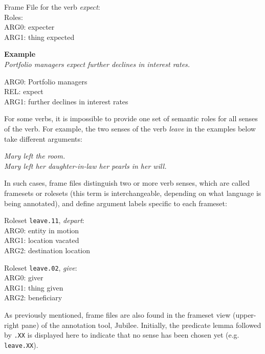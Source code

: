 \documentclass[11pt]{report}
\begin{document}
Frame File for the verb \textit{expect}:\\
Roles: \\
ARG0: expecter\\
ARG1: thing expected

\textbf{Example}\\
\textit{Portfolio managers expect further declines in interest rates.}

ARG0: Portfolio managers\\
REL: expect\\
ARG1: further declines in interest rates

\noindent For some verbs, it is impossible to provide one set of semantic roles for all senses of the verb. For example, the two senses of the verb \textit{leave} in the examples below take different arguments: 

\textit{Mary left the room.}\\
\textit{Mary left her daughter-in-law her pearls in her will.}

\noindent In such cases, frame files distinguish two or more verb senses, which are called framesets or rolesets (this term is interchangeable, depending on what language is being annotated), and define argument labels specific to each frameset: 

Roleset \texttt{leave.11}, \textit{depart}:\\
ARG0: entity in motion\\
ARG1: location vacated\\
ARG2: destination location

Roleset \texttt{leave.02}, \textit{give}:\\
ARG0: giver \\
ARG1: thing given\\
ARG2: beneficiary

As previously mentioned, frame files are also found in the frameset view (upper-right pane) of the annotation tool, Jubilee.  Initially, the predicate lemma followed by {\tt.XX} is displayed here to indicate that no sense has been chosen yet (e.g. {\tt leave.XX}).  
\end{document}
